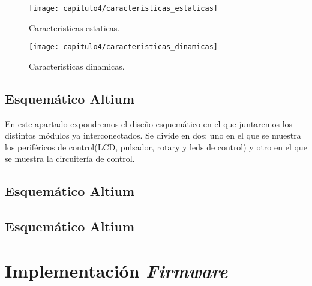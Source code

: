 \smallskip
\begin{figure}[H]%
\noindent \begin{centering}
\texttt{[image: capitulo4/caracteristicas\_estaticas]}
\par\end{centering}
\caption{\label{fig:caracteristicas_estaticas} Caracteristicas estaticas.}
\end{figure}
\smallskip

\smallskip
\begin{figure}[H]%
\noindent \begin{centering}
\texttt{[image: capitulo4/caracteristicas\_dinamicas]}
\par\end{centering}
\caption{\label{fig:caracteristicas_dinamicas} Caracteristicas dinamicas.}
\end{figure}
\smallskip






\subsection{Esquemático Altium}
En este apartado expondremos el diseño esquemático en el que juntaremos los distintos módulos ya interconectados. Se divide en dos: uno en el que se muestra los periféricos de control(LCD, pulsador, rotary y leds de control) y otro en el que se muestra la circuitería de control.

\subsection{Esquemático Altium}



\subsection{Esquemático Altium}




\section{Implementación \textit{Firmware}}
\label{sec:ImpFirm}


